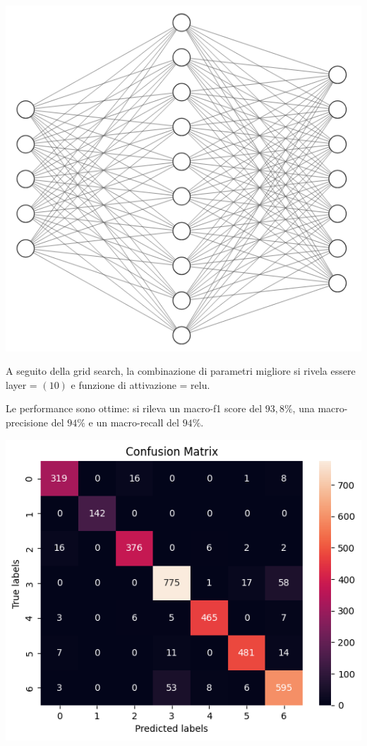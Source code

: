 \begin{Figure}
    \centering
    \includegraphics[width=0.75\linewidth]{img/mlp.png}
\end{Figure}

A seguito della grid search, la combinazione di parametri migliore si rivela essere 
layer = $(10)$ e funzione di attivazione = relu.

Le performance sono ottime: si rileva un macro-f1 score del $93,8\%$, 
una macro-precisione del $94\%$ e un macro-recall del $94\%$.

\begin{Figure}
    \centering
    \includegraphics[width=\linewidth]{img/mlp_low_confusion_matrix.png}
\end{Figure}


